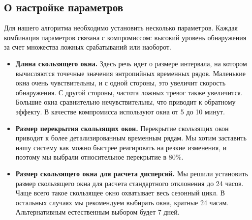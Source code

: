 \documentclass[]{interact}
\theoremstyle{plain}%
\theoremstyle{definition}
\theoremstyle{remark}
\begin{document}
\subsection{О настройке параметров}
Для нашего алгоритма необходимо установить несколько параметров. Каждая комбинация параметров связана с компромиссом: высокий уровень обнаружения за счет множества ложных срабатываний или наоборот.

\begin{itemize}
    \item \textbf{Длина скользящего окна.} Здесь речь идет о размере интервала, на котором вычисляются точечные значения энтропийных временных рядов. Маленькие окна очень чувствительны, и с одной стороны, это увеличит скорость обнаружения. С другой стороны, частота ложных тревог также увеличится. Большие окна сравнительно нечувствительны, что приводит к обратному эффекту. В качестве компромисса используют окна от 5 до 10 минут.
    \item \textbf{Размер перекрытия скользящих окон.} Перекрытие скользящих окон приводит к более детализированным временным рядам. Мы хотим заставить нашу систему как можно быстрее реагировать на резкие изменения, и поэтому мы выбрали относительное перекрытие в $80\%$.
    \item \textbf{Размер скользящего окна для расчета дисперсий.} Мы решили установить размер скользящего окна для расчета стандартного отклонения до 24 часов. Чаще всего такое скользящее окно охватывает весь сезонный цикл. В остальных случаях мы рекомендуем выбирать окна, кратные 24 часам. Альтернативным естественным выбором будет 7 дней.
\end{itemize}
\end{document}
